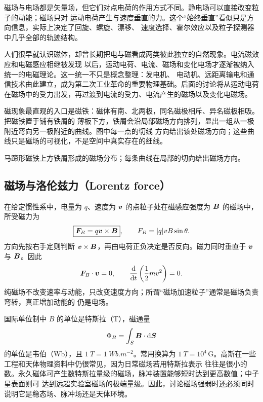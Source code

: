 {磁场与电场都是矢量场，但它们对点电荷的作用方式不同。静电场可以直接改变粒子的动能；磁场只对
运动电荷产生与速度垂直的力。这个“始终垂直”看似只是方向信息，实际上决定了回旋、螺旋、漂移、
速度选择、霍尔效应以及粒子探测器中几乎全部的轨迹结构。

人们很早就认识磁体，却曾长期把电与磁看成两类彼此独立的自然现象。电流磁效应和电磁感应相继被发现
以后，运动电荷、电流、磁场和变化电场才逐渐被纳入统一的电磁理论。这一统一不只是概念整理：发电机、
电动机、远距离输电和通信技术由此建立，成为第二次工业革命的重要物理基础。后面的讨论将从运动电荷
在磁场中的受力出发，再过渡到电流的受力、电流产生的磁场以及变化电磁场。

磁现象最直观的入口是磁铁：磁体有南、北两极，同名磁极相斥、异名磁极相吸。把磁铁置于铺有铁屑的
薄板下方，铁屑会沿局部磁场方向排列，显出一组从一极附近弯向另一极附近的曲线。图中每一点的切线
方向给出该处磁场方向；这些曲线只是磁场的可视化，不是空间中真实存在的细线。

%
{马蹄形磁铁上方铁屑形成的磁场分布；每条曲线在局部的切向给出磁场方向。}\label{ch22:fig:s38-7-1}


\subsection{磁场与洛伦兹力（Lorentz force）}


在给定惯性系中，电量为 $q$、速度为 $\bm{v}$ 的点粒子处在磁感应强度为 $\bm{B}$ 的磁场中，
所受磁力为
\begin{equation}
  \boxed{\bm{F}_B=q\bm{v}\times\bm{B}},
  \qquad F_B=|q|vB\sin\theta .
\end{equation}
方向先按右手定则判断 $\bm{v}\times\bm{B}$，再由电荷正负决定是否反向。磁力同时垂直于
$\bm{v}$ 与 $\bm{B}$。因此
\begin{equation}
  \bm{F}_B\cdot\bm{v}=0,
  \qquad \frac{\mathop{}\!\mathrm d}{\mathop{}\!\mathrm d t}\left(\frac12mv^2\right)=0.
\end{equation}
纯磁场不改变速率与动能，只改变速度方向；所谓“磁场加速粒子”通常是磁场负责弯转，真正增加动能的
仍是电场。

\lorentzDirectionDiagram

国际单位制中 $B$ 的单位是特斯拉（T），磁通量
\begin{equation}
  \Phi_B=\int_S\bm{B}\cdot\mathop{}\!\mathrm d\bm{S}
\end{equation}
的单位是韦伯（Wb），且 $\SI{1}{T}=\SI{1}{Wb.m^{-2}}$。常用换算为
$\SI{1}{T}=10^4\,\mathrm G$。高斯在一些工程和天体物理资料中仍很常见，因为日常磁场若用特斯拉表示
往往是很小的数。永久磁体可产生数特斯拉量级的磁场，脉冲装置能够短时达到更高数值；中子星表面则可
达到远超实验室磁场的极端量级。因此，讨论磁场强弱时还必须同时说明它是稳态场、脉冲场还是天体环境。


}
